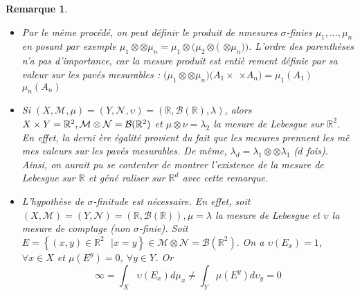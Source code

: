 \documentclass[3pt]{article}
\newtheorem{remark}[theorem]{Remarque}
\begin{document}
\bigskip 

\begin{remark}

\begin{itemize}
\item Par le m\^{e}me proc\'{e}d\'{e}, on peut d\'{e}finir le produit de
nmesures $\sigma $-finies $\mu _{1},...,\mu _{n}$ en posant par exemple $\mu
_{1}\otimes $\textperiodcentered \textperiodcentered \textperiodcentered $%
\otimes \mu _{n}=\mu _{1}\otimes (\mu _{2}\otimes ($\textperiodcentered
\textperiodcentered \textperiodcentered $\otimes \mu _{n})).$ L'ordre des
parenth\`{e}ses n'a pas d'importance, car la mesure produit est enti\`{e}%
rement d\'{e}finie par sa valeur sur les pav\'{e}s mesurables : $(\mu
_{1}\otimes $\textperiodcentered \textperiodcentered \textperiodcentered $%
\otimes \mu _{n})(A_{1}\times $\textperiodcentered \textperiodcentered
\textperiodcentered $\times A_{n})=\mu _{1}(A_{1})$\textperiodcentered
\textperiodcentered \textperiodcentered $\mu _{n}(A_{n})$

\item Si $(X,\mathcal{M},\mu )=(Y,\mathcal{N},\upsilon )=(\mathbb{R},%
\mathcal{B}(\mathbb{R}),\lambda )$, alors $X\times Y=\mathbb{R}^{2},\mathcal{%
M}\otimes \mathcal{N}=\mathcal{B}(\mathbb{R}^{2})$ et $\mu \otimes \nu
=\lambda _{2}$ la mesure de Lebesgue sur $\mathbb{R}^{2}$. En effet, la derni%
\`{e}re \'{e}galit\'{e} provient du fait que les mesures prennent les m\^{e}%
mes valeurs sur les pav\'{e}s mesurables. De m\^{e}me, $\lambda _{d}=\lambda
_{1}\otimes $\textperiodcentered \textperiodcentered \textperiodcentered $%
\otimes \lambda _{1}$ ($d$ fois). Ainsi, on aurait pu se contenter de
montrer l'existence de la mesure de Lebesgue sur $\mathbb{R}$ et g\'{e}n\'{e}%
raliser sur $\mathbb{R}^{d}$ avec cette remarque.

\item L'hypoth\`{e}se de $\sigma $-finitude est n\'{e}cessaire. En effet,
soit $(X,\mathcal{M})=(Y,\mathcal{N})=(\mathbb{R},\mathcal{B}(\mathbb{R}%
)),\mu =\lambda $ la mesure de Lebesgue et $\upsilon $ la mesure de comptage
(non $\sigma $-finie). Soit $E=\left\{ (x,y)\in \mathbb{R}^{2}\text{ }|\text{
}x=y\right\} \in \mathcal{M}\otimes \mathcal{N}=\mathcal{B}(\mathbb{R}^{2}).$
On a $\upsilon (E_{x})=1$, $\forall x\in X$ et $\mu (E^{y})=0$, $\forall
y\in Y$. Or%
\begin{equation*}
\infty =\int_{X}\upsilon (E_{x})d\mu _{x}\neq \int_{Y}\mu (E^{y})d\upsilon
_{y}=0
\end{equation*}
\end{itemize}
\end{remark}
\end{document}
